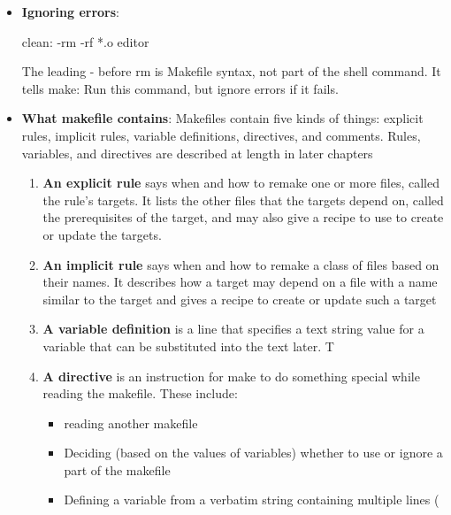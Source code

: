 \documentclass{report}
\begin{document}
\begin{itemize}
\begin{bashcode}
                kbd.o: kbd.c defs.h command.h
                    cc -c kbd.c

                command.o: command.c defs.h command.h
                    cc -c command.c

                clean:
                    rm -f *.o editor
            \end{bashcode}
        \item \textbf{Ignoring errors}: 
            \bigbreak \noindent 
            \begin{bashcode}
            clean: 
                -rm -rf *.o editor
            \end{bashcode}
            \bigbreak \noindent 
            The leading - before rm is Makefile syntax, not part of the shell command. It tells make: Run this command, but ignore errors if it fails.
        \item \textbf{What makefile contains}: Makefiles contain five kinds of things: explicit rules, implicit rules, variable definitions, directives, and comments. Rules, variables, and directives are described at length in later chapters 
            \begin{enumerate}
                \item \textbf{An explicit rule} says when and how to remake one or more files, called the rule’s targets. It lists the other files that the targets depend on, called the prerequisites of the target, and may also give a recipe to use to create or update the targets. 
                \item \textbf{An implicit rule} says when and how to remake a class of files based on their names. It describes how a target may depend on a file with a name similar to the target and gives a recipe to create or update such a target
                \item \textbf{A variable definition} is a line that specifies a text string value for a variable that can be substituted into the text later. T
                \item \textbf{A directive} is an instruction for make to do something special while reading the makefile. These include: 
                    \begin{itemize}
                        \item reading another makefile
                        \item Deciding (based on the values of variables) whether to use or ignore a part of the makefile
                        \item Defining a variable from a verbatim string containing multiple lines (

\end{itemize}
\end{enumerate}
\end{itemize}
\end{document}
